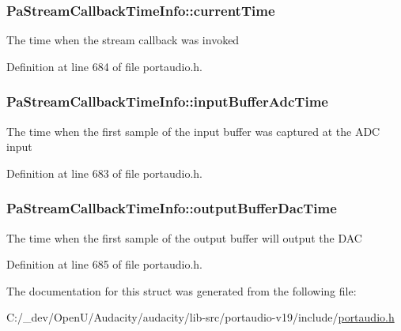 \subsubsection[{\texorpdfstring{current\+Time}{currentTime}}]{ Pa\+Stream\+Callback\+Time\+Info\+::current\+Time}\hypertarget{struct_pa_stream_callback_time_info_af21eb5482cadb212dae38fdbbd9bebfb}{}\label{struct_pa_stream_callback_time_info_af21eb5482cadb212dae38fdbbd9bebfb}
The time when the stream callback was invoked 

Definition at line 684 of file portaudio.\+h.

\subsubsection[{\texorpdfstring{input\+Buffer\+Adc\+Time}{inputBufferAdcTime}}]{ Pa\+Stream\+Callback\+Time\+Info\+::input\+Buffer\+Adc\+Time}\hypertarget{struct_pa_stream_callback_time_info_ad114a6d5e1cf2cdd75837c33c1c8bb4c}{}\label{struct_pa_stream_callback_time_info_ad114a6d5e1cf2cdd75837c33c1c8bb4c}
The time when the first sample of the input buffer was captured at the A\+DC input 

Definition at line 683 of file portaudio.\+h.

\subsubsection[{\texorpdfstring{output\+Buffer\+Dac\+Time}{outputBufferDacTime}}]{ Pa\+Stream\+Callback\+Time\+Info\+::output\+Buffer\+Dac\+Time}\hypertarget{struct_pa_stream_callback_time_info_aa2052c42394fca748e83517fc8942609}{}\label{struct_pa_stream_callback_time_info_aa2052c42394fca748e83517fc8942609}
The time when the first sample of the output buffer will output the D\+AC 

Definition at line 685 of file portaudio.\+h.



The documentation for this struct was generated from the following file\+:\begin{DoxyCompactItemize}
\item 
C\+:/\+\_\+dev/\+Open\+U/\+Audacity/audacity/lib-\/src/portaudio-\/v19/include/\hyperlink{portaudio_8h}{portaudio.\+h}\end{DoxyCompactItemize}
